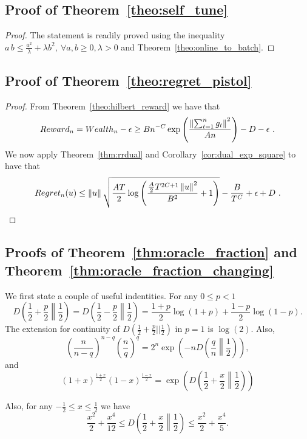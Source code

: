 \subsection{Proof of Theorem~\ref{theo:self_tune}}
\begin{proof}
The statement is readily proved using the inequality $a\,b \leq \frac{a^2}{\lambda} + \lambda b^2, \ \forall a,b\geq0, \lambda>0$ and Theorem~\ref{theo:online_to_batch}.
\end{proof}

\subsection{Proof of Theorem~\ref{theo:regret_pistol}}
\begin{proof}
From Theorem~\ref{theo:hilbert_reward} we have that
\[
Reward_n = Wealth_n - \epsilon  \geq B n^{-C} \exp\left(\frac{\left\|{\sum_{t=1}^n g_t}\right\|^2}{A n}\right)-D - \epsilon~.
\]
We now apply Theorem~\ref{thm:rrdual} and Corollary~\ref{cor:dual_exp_square} to have that 
\[
Regret_n(u) \leq \left\|{u}\right\| \sqrt{\frac{A T}{2} \log \left(\frac{\frac{A}{2} T^{2C+1} \left\|{u}\right\|^2}{B^2} +1 \right)} - \frac{B}{T^{C}} + \epsilon+D~. \qedhere
\]
\end{proof}


\subsection{Proofs of Theorem~\ref{thm:oracle_fraction} and Theorem~\ref{thm:oracle_fraction_changing}}

We first state a couple of useful indentities.
For any $ 0\leq p < 1$
\[
D\left(\frac{1}{2}+\frac{p}{2}\middle\|\frac{1}{2}\right) = D\left(\frac{1}{2}-\frac{p}{2}\middle\|\frac{1}{2}\right)= \frac{1+p}{2} \log(1+p) + \frac{1-p}{2} \log(1-p).
\]
The extension for continuity of $D(\frac{1}{2}+\frac{p}{2}||\frac{1}{2})$ in $p=1$ is $\log(2)$.
Also,
\[
\left(\frac{n}{n-q}\right)^{n-q} \left(\frac{n}{q}\right)^{q} = 2^n \exp\left(-n D\left(\frac{q}{n}\middle\|\frac{1}{2}\right)\right),
\]
and
\begin{equation}
\label{eq:div_2}
\left(1+x\right)^\frac{1+x}{2} \left(1-x\right)^\frac{1-x}{2}= \exp\left( D\left(\frac{1}{2}+\frac{x}{2}\middle\|\frac{1}{2}\right) \right)
\end{equation}

Also, for any $-\frac{1}{2} \leq x\leq \frac{1}{2}$ we have
\[
\frac{x^2}{2} +\frac{x^4}{12}\leq D\left(\frac{1}{2}+\frac{x}{2}\middle\|\frac{1}{2}\right) \leq \frac{x^2}{2} + \frac{x^4}{5}.
\]

